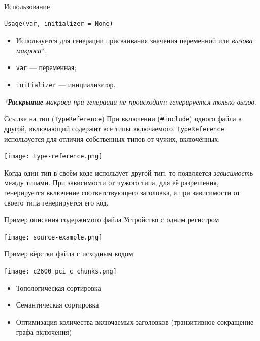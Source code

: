 \documentclass[unicode,hyperref={unicode=true}]{beamer}
\theoremstyle{definition}
\theoremstyle{plain}
\begin{document}
\begin{frame}[fragile]{Использование}
\lstset{language=Python}
\begin{lstlisting}
Usage(var, initializer = None)
\end{lstlisting}
\vfill

\begin{itemize}
\item Используется для генерации присваивания значения переменной или
    \textit{вызова макроса}*.
\item \texttt{var} --- переменная;
\item \texttt{initializer} --- инициализатор.
\end{itemize}

\vfill
\textit{*\textbf{Раскрытие} макроса при генерации не происходит: генерируется
только вызов.}
\end{frame}



\begin{frame}[fragile]{Ссылка на тип (\texttt{TypeReference})}
При включении (\texttt{\#include}) одного файла в другой, включающий
содержит все типы включаемого. \texttt{TypeReference} используется для
отличия собственных типов от чужих, включённых.

\vfill

\begin{center}
\texttt{[image: type-reference.png]}
\end{center}

\vfill

Когда один тип в своём коде использует другой тип, то появляется
\textit{зависимость} между типами.
При зависимости от чужого типа, для её разрешения, генерируется включение
соответствующего заголовка, а при зависимости от своего типа
генерируется его код.
\end{frame}



\begin{frame}{Пример описания содержимого файла}
Устройство с одним регистром\\
\vfill
\begin{center}
\texttt{[image: source-example.png]}
\end{center}
\end{frame}



\begin{frame}{Пример вёрстки файла с исходным кодом}
\begin{minipage}{0.61\textwidth}
\texttt{[image: c2600\_pci\_c\_chunks.png]}
\end{minipage}
\hfill
\begin{minipage}{0.34\textwidth}
\begin{itemize}
\item Топологическая сортировка
\item Семантическая сортировка
\item Оптимизация количества включаемых заголовков (транзитивное сокращение
графа включения)
\end{itemize}
\end{minipage}
\end{frame}
\end{document}
